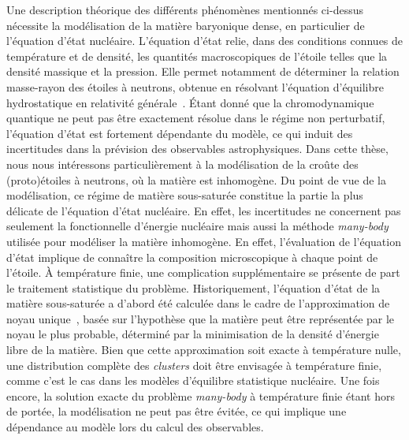 Une description théorique des différents phénomènes mentionnés ci-dessus 
nécessite la modélisation de la matière baryonique dense, en particulier de 
l'équation d'état nucléaire. 
%
L'équation d'état relie, dans des conditions connues de température et 
de densité, les quantités macroscopiques de l'étoile telles que la densité
massique et la pression. Elle permet notamment de déterminer la relation 
masse-rayon des étoiles à neutrons, obtenue en résolvant l'équation 
d'équilibre hydrostatique en relativité 
générale~\cite{Tolman1939,Oppenheimer1939}.
%
Étant donné que la chromodynamique quantique ne peut pas être exactement 
résolue dans le régime non perturbatif, l'équation d'état est fortement 
dépendante du modèle, ce qui induit des incertitudes dans la prévision des 
observables astrophysiques. 
Dans cette thèse, nous nous intéressons particulièrement à la modélisation de 
la croûte des (proto)étoiles à neutrons, où la matière est inhomogène. Du point 
de vue de la modélisation, ce régime de matière sous-saturée constitue la 
partie la plus délicate de l'équation d'état nucléaire. 
En effet, les incertitudes ne concernent pas 
seulement la fonctionnelle d'énergie nucléaire mais aussi la méthode
\textit{many-body} utilisée pour modéliser la matière inhomogène. 
%
En effet, l'évaluation de l'équation d'état implique de connaître la 
composition microscopique à chaque point de l'étoile. 
À température finie, une complication supplémentaire se présente de part le 
traitement statistique du problème. 
Historiquement, l'équation d'état de la matière sous-saturée a d'abord été 
calculée dans le cadre de l'approximation de noyau 
unique~\cite{BBP,Negele1973}, basée sur l'hypothèse que la matière 
peut être représentée par le noyau le plus probable, déterminé par la 
minimisation de la densité d'énergie libre de la matière. Bien que cette 
approximation soit exacte à température nulle, une distribution complète des 
\textit{clusters} doit être envisagée à température finie, comme c'est le cas 
dans les modèles d'équilibre statistique nucléaire. 
Une fois encore, la solution exacte du problème \textit{many-body} à 
température finie étant hors de portée, la modélisation ne peut pas être 
évitée, ce qui implique une dépendance au modèle lors du calcul des 
observables. 

